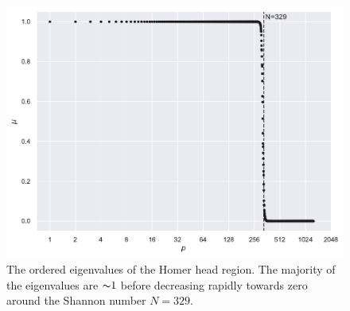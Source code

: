 \begin{figure}[htpb]
	\centering\capstart{}
	\includegraphics[width=\textwidth]{homer_slepian_eigenvalues_b1275.pdf}
	\caption[
		The Slepian eigenvalues of the Homer head region
	]{
		The ordered eigenvalues of the Homer head region.
		The majority of the eigenvalues are \({\thicksim}\num{1}\) before decreasing rapidly towards zero around the Shannon number \(N=329\).
	}\label{fig:chapter5_slepian_eigenvalues}
\end{figure}
